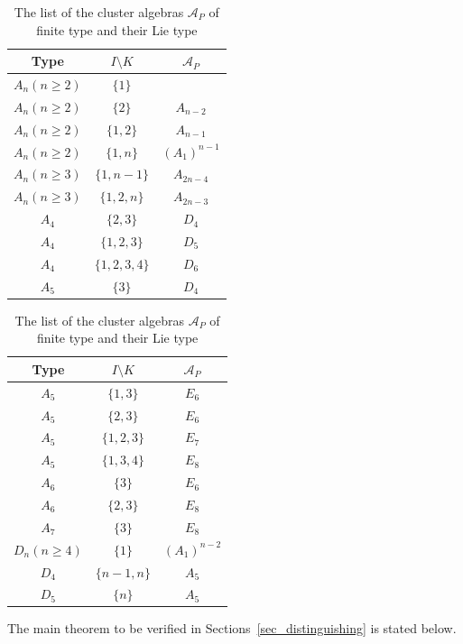 \documentclass[11pt]{amsart}
\def\mcal{\mathcal}
\numberwithin{equation}{section}
\theoremstyle{plain}
\theoremstyle{definition}
\numberwithin{equation}{section}
\begin{document}
\begin{table}[h]
\begin{center}
\begin{tabular}{| c | c | c | }
 \hline
 Type & $I \setminus K$ & $\mcal{A}_P$ \\ 
 \hline  \hline
$A_n (n \geq 2)$ & $\{1\}$ &  \\   
$A_n (n \geq 2)$ & $\{2\}$ & $A_{n-2}$  \\  
$A_n (n \geq 2)$ & $\{1, 2\}$ & $A_{n-1}$  \\  
$A_n (n \geq 2)$ & $\{1, n\}$ & $(A_1)^{n-1}$  \\  
$A_n (n \geq 3)$ & $\{1, n-1\}$ & $A_{2n-4}$  \\  
$A_n (n \geq 3)$ & $\{1, 2, n\}$ & $A_{2n-3}$  \\ 
\hline 
$A_4$ & $\{2,3\}$ & $D_4$  \\   
$A_4$ & $\{1,2,3\}$ & $D_5$  \\   
$A_4$ & $\{1,2,3,4\}$ & $D_6$  \\   
\hline 
$A_5$ & $\{3\}$ & $D_4$  \\   
\hline 
\end{tabular}
 \quad
\begin{tabular}{| c | c | c | }
 \hline
 Type & $I \setminus K$ & $\mcal{A}_P$ \\ 
 \hline  \hline
$A_5$ & $\{1, 3\}$ & $E_6$  \\   
$A_5$ & $\{2, 3\}$ & $E_6$  \\   
$A_5$ & $\{1, 2, 3\}$ & $E_7$  \\   
$A_5$ & $\{1, 3, 4\}$ & $E_8$  \\   
\hline 
$A_6$ & $\{3\}$ & $E_6$  \\   
$A_6$ & $\{2, 3\}$ & $E_8$  \\   
\hline 
$A_7$ & $\{3\}$ & $E_8$  \\   
\hline
$D_n (n \geq 4)$ & $\{1\}$ & $(A_1)^{n-2}$  \\   
\hline
$D_4$ & $\{n-1, n\}$ & $A_5$  \\   
\hline
$D_5$ & $\{n\}$ & $A_5$  \\   
\hline
\end{tabular}
\end{center}
\caption{The list of the cluster algebras $\mcal{A}_P$ of finite type and their Lie type}
\label{table_listfiniteparbolic}
\end{table}

The main theorem to be verified in Sections~\ref{sec_distinguishing} is stated below.
\end{document}
